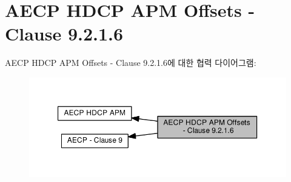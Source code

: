 \hypertarget{group__aecpdu__hdcp__apm__offsets}{}\section{A\+E\+CP H\+D\+CP A\+PM Offsets -\/ Clause 9.2.1.6}
\label{group__aecpdu__hdcp__apm__offsets}
A\+E\+CP H\+D\+CP A\+PM Offsets -\/ Clause 9.2.1.6에 대한 협력 다이어그램\+:
\nopagebreak
\begin{figure}[H]
\begin{center}
\leavevmode
\includegraphics[width=350pt]{group__aecpdu__hdcp__apm__offsets}
\end{center}
\end{figure}
